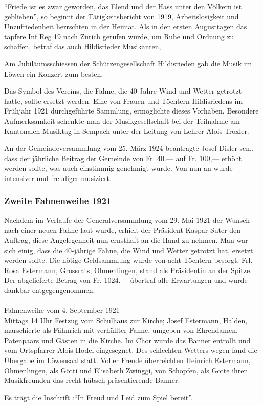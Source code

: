 \begin{history}
    \enquote{Friede ist es zwar geworden, das Elend und der Hass unter den
        Völkern ist geblieben}, so beginnt der Tätigkeitsbericht von 1919,
    Arbeitslosigkeit und Unzufriedenheit herrschten in der Heimat. Als in
    den ersten Augusttagen das tapfere Inf Reg 19 nach Zürich gerufen wurde,
    um Ruhe und Ordnung zu schaffen, betraf das auch Hildisrieder
    Musikanten,

    Am Jubiläumsschiessen der Schützengesellschaft Hildisrieden gab die Musik im
    Löwen ein Konzert zum besten.

    Das Symbol des Vereins, die Fahne, die 40 Jahre Wind und Wetter getrotzt
    hatte, sollte ersetzt werden. Eine von Frauen und Töchtern Hildisriedens im
    Frühjahr 1921 durchgeführte Sammlung, ermöglichte dieses Vorhaben. Besondere
    Aufmerksamkeit schenkte man der Musikgesellschaft bei der Teilnahme am
    Kantonalen Musiktag in Sempach unter der Leitung von Lehrer Alois Troxler.

    An der Gemeindeversammlung vom 25. März 1924 beantragte Josef Disler sen.,
    dass der jährliche Beitrag der Gemeinde von Fr. 40.— auf Fr. 100,— erhöht
    werden sollte, was auch einstimmig genehmigt wurde. Von nun an wurde
    intensiver und freudiger musiziert.

    \subsubsection{Zweite Fahnenweihe 1921}

    Nachdem im Verlaufe der Generalversammlung vom 29. Mai 1921 der Wunsch nach
    einer neuen Fahne laut wurde, erhielt der Präsident Kaspar Suter den
    Auftrag, diese Angelegenheit nun ernsthaft an die Hand zu nehmen. Man war
    sich einig, dass die 40-jährige Fahne, die Wind und Wetter getrotzt hat,
    ersetzt werden sollte. Die nötige Geldsammlung wurde von acht Töchtern
    besorgt. Frl. Rosa Estermann, Grossrats, Ohmenlingen, stand als Präsidentin
    an der Spitze. Der abgelieferte Betrag von Fr. 1024.— übertraf alle
    Erwartungen und wurde dankbar entgegengenommen.\\
    \\
    Fahnenweihe vom 4. September 1921\\
    Mittags 14 Uhr Festzug vom Schulhaus zur Kirche; Josef Estermann, Halden,
    marschierte als Fähnrich mit verhüllter Fahne, umgeben von Ehrendamen,
    Patenpaars und Gästen in die Kirche. Im Chor wurde das Banner entrollt und
    vom Ortspfarrer Alois Hodel eingesegnet. Des schlechten Wetters wegen fand
    die Übergabe im Löwensaal statt. Voller Freude überreichten Heinrich
    Estermann, Ohmenlingen, als Götti und Elisabeth Zwinggi, von Schopfen, als
    Gotte ihren Musikfreunden das recht hübsch präsentierende Banner.

    Es trägt die Inschrift :\enquote{In Freud und Leid zum Spiel bereit}.

\end{history}


